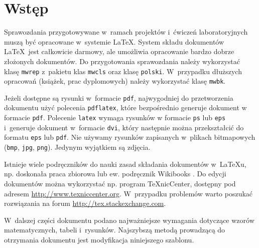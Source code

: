 \chapter{Wstęp}
Sprawozdania przygotowywane w~ramach projektów i~ćwiczeń laboratoryjnych muszą być opracowane w~systemie \LaTeX. System składu dokumentów \LaTeX \ jest całkowicie darmowy, ale umożliwia opracowanie bardzo dobrze złożonych dokumentów. Do przygotowania sprawozdania należy wykorzystać klasę \verb+mwrep+ z~pakietu klas \verb+mwcls+ \cite{litWolinski2013} oraz klasę \verb+polski+. W~przypadku dłuższych opracowań (książek, prac dyplomowych) należy wykorzystać klasę \verb+mwbk+.

Jeżeli dostępne są rysunki w~formacie \verb+pdf+, najwygodniej do przetworzenia dokumentu użyć polecenia \verb+pdflatex+, które bezpośrednio generuje dokument w formacie \verb+pdf+. Polecenie \verb+latex+ wymaga rysunków w formacie \verb+ps+ lub \verb+eps+ i~generuje dokument w~formacie \verb+dvi+, który następnie można przekształcić do formatu \verb+eps+ lub \verb+pdf+. Nie używamy rysunków zapisanych w~plikach bitmapowych (\verb+bmp+, \verb+jpg+, \verb+png+). Jedynym wyjątkiem są zdjęcia.

Istnieje wiele podręczników do nauki zasad składania dokumentów w~\LaTeX u, np. doskonała praca zbiorowa \cite{litOetiker2007} lub ew. podręcznik Wikibooks \cite{litlatexwiki2017}. Do edycji dokumentów można wykorzystać np. program \TeX nicCenter, dostępny pod adresem \url{http://www.texniccenter.org}. W~przypadku problemów warto poszukać rozwiązania na forum \url{http://tex.stackexchange.com}.

W~dalszej części dokumentu podano najważniejsze wymagania dotyczące wzorów matematycznych, tabeli i~rysunków. Najszybszą metodą prowadzącą do otrzymania dokumentu jest modyfikacja niniejszego szablonu.